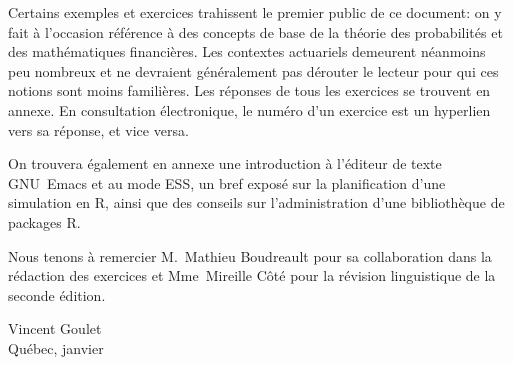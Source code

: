 Certains exemples et exercices trahissent le premier public de ce
document: on y fait à l'occasion référence à des concepts de base de
la théorie des probabilités et des mathématiques financières. Les
contextes actuariels demeurent néanmoins peu nombreux et ne devraient
généralement pas dérouter le lecteur pour qui ces notions sont moins
familières. Les réponses de tous les exercices se trouvent en annexe.
En consultation électronique, le numéro d'un exercice est un hyperlien
vers sa réponse, et vice versa.

On trouvera également en annexe une introduction à l'éditeur de texte
GNU~Emacs et au mode ESS, un bref exposé sur la planification d'une
simulation en R, ainsi que des conseils  sur l'administration d'une
bibliothèque de packages R.

Nous tenons à remercier M.~Mathieu Boudreault pour sa collaboration
dans la rédaction des exercices et Mme~Mireille Côté pour la révision
linguistique de la seconde édition.

\begin{flushright}
  Vincent Goulet \\
  Québec, janvier \year
\end{flushright}


